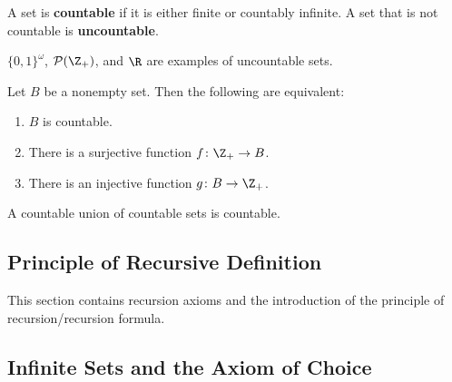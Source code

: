 \begin{definition}
A set is \textbf{countable} if it is either finite or countably infinite. A set that is not countable is \textbf{uncountable}.
\end{definition}

\begin{eg}
$\{0, 1\}^\omega$, $\mathcal{P} (\Z_+)$, and $\R$ are examples of uncountable sets.
\end{eg}

\begin{theorem}
Let $B$ be a nonempty set. Then the following are equivalent:
\begin{enumerate}
    \item $B$ is countable.
    \item There is a surjective function $f\colon \Z_+ \rightarrow B$.
    \item There is an injective function $g\colon B \rightarrow \Z_+$.
\end{enumerate}    
\end{theorem}

\begin{theorem}
A countable union of countable sets is countable.
\end{theorem}

\subsection{Principle of Recursive Definition}
This section contains recursion axioms and the introduction of the principle of recursion/recursion formula.  

\subsection{Infinite Sets and the Axiom of Choice}